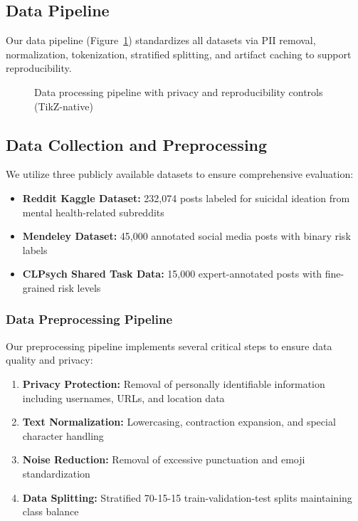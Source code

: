 \documentclass[conference]{IEEEtran}
\begin{document}
\subsection{Data Pipeline}

Our data pipeline (Figure~\ref{fig:data_pipeline}) standardizes all datasets via PII removal, normalization, tokenization, stratified splitting, and artifact caching to support reproducibility.

\begin{figure}[H]
    \centering
    \resizebox{\linewidth}{!}{\DataPipelineDiagram}
    \caption{Data processing pipeline with privacy and reproducibility controls (TikZ-native)}
    \label{fig:data_pipeline}
\end{figure}

\subsection{Data Collection and Preprocessing}

We utilize three publicly available datasets to ensure comprehensive evaluation:

\begin{itemize}
    \item \textbf{Reddit Kaggle Dataset:} 232,074 posts labeled for suicidal ideation from mental health-related subreddits
    \item \textbf{Mendeley Dataset:} 45,000 annotated social media posts with binary risk labels
    \item \textbf{CLPsych Shared Task Data:} 15,000 expert-annotated posts with fine-grained risk levels
\end{itemize}

\subsubsection{Data Preprocessing Pipeline}

Our preprocessing pipeline implements several critical steps to ensure data quality and privacy:

\begin{enumerate}
    \item \textbf{Privacy Protection:} Removal of personally identifiable information including usernames, URLs, and location data
    \item \textbf{Text Normalization:} Lowercasing, contraction expansion, and special character handling
    \item \textbf{Noise Reduction:} Removal of excessive punctuation and emoji standardization
    \item \textbf{Data Splitting:} Stratified 70-15-15 train-validation-test splits maintaining class balance
\end{enumerate}
\end{document}
